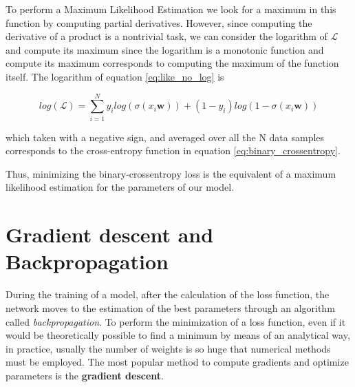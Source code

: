 \documentclass[11pt]{report}
\begin{document}
To perform a Maximum Likelihood Estimation we look for a maximum in this function by computing partial derivatives.
However, since computing the derivative of a product is a nontrivial task, we can consider the logarithm of $\mathcal{L}$ and compute its maximum  since the logarithm is a monotonic function and compute its maximum corresponds to computing the maximum of the function itself.
The logarithm of equation \ref{eq:like_no_log} is

\begin{equation}\label{eq:like_si_log}
log(\mathcal{L}) = \sum_{i=1}^N y_i log(\sigma(x_i \mathbf{w})) + (1-y_i)log(1-\sigma(x_i \mathbf{w}))
\end{equation}

which taken with a negative sign, and averaged over all the N data samples corresponds to the cross-entropy function in equation \ref{eq:binary_crossentropy}.

Thus, minimizing the binary-crossentropy loss is the equivalent of a maximum likelihood estimation for the parameters of our model.




\section{Gradient descent and Backpropagation}\label{sec:backpropagation_theory}

During the training of a model, after the calculation of the loss function, the network moves to the estimation of the best parameters through an algorithm called \emph{backpropagation}.
To perform the minimization of a loss function, even if it would be theoretically possible to find a minimum by means of an analytical way, in practice, usually the number of weights is so huge that numerical methods must be employed.
The most popular method to compute gradients and optimize parameters is the \textbf{gradient descent}.
\end{document}
